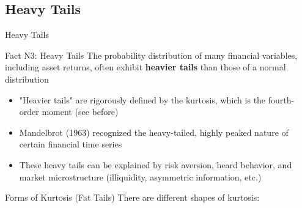 \documentclass{beamer}
\begin{document}
\subsection{Heavy Tails}
\begin{frame}{Heavy Tails}
  \begin{exampleblock}{Fact N3: Heavy Tails}
    The probability distribution of many financial variables, including asset returns, often exhibit \textbf{heavier tails} than those of a normal distribution
  \end{exampleblock}

  \begin{itemize}
  \item "Heavier tails" are rigorously defined by the kurtosis, which is the fourth-order moment (see before)
  \item Mandelbrot (1963) recognized the heavy-tailed, highly peaked nature of certain financial time series
  \item These heavy tails can be explained by risk aversion, heard behavior, and market microstructure (illiquidity, asymmetric information, etc.)
  \end{itemize}    
\end{frame}


\begin{frame}{Forms of Kurtosis (Fat Tails)}
  There are different shapes of kurtosis:\\ 
\end{frame}
\end{document}
